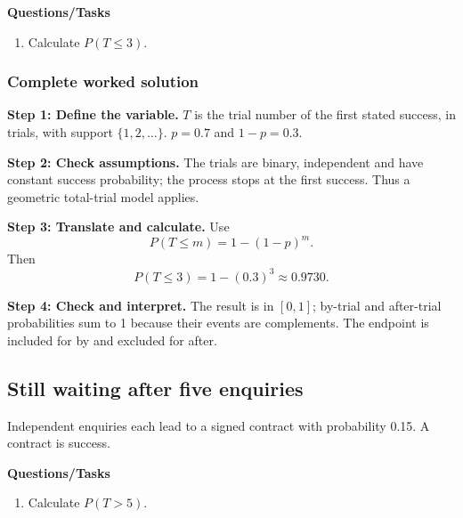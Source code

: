 \textbf{Questions/Tasks}
\begin{enumerate}
\item Calculate $P(T\leq3)$. 
\end{enumerate}
\subsubsection*{Complete worked solution}
\par\noindent\begin{minipage}{\linewidth}
\textbf{Step 1: Define the variable.} $T$ is the trial number of the first stated success, in trials, with support $\{1,2,\ldots\}$. $p=0.7$ and $1-p=0.3$.
\end{minipage}\par\medskip
\par\noindent\begin{minipage}{\linewidth}
\textbf{Step 2: Check assumptions.} The trials are binary, independent and have constant success probability; the process stops at the first success. Thus a geometric total-trial model applies.
\end{minipage}\par\medskip
\par\noindent\begin{minipage}{\linewidth}
\textbf{Step 3: Translate and calculate.} Use
\[P(T\leq m)=1-(1-p)^m.\]
Then
\[P(T\leq3)=1-(0.3)^3\approx 0.9730.\]
\end{minipage}\par\medskip
\par\noindent\begin{minipage}{\linewidth}
\textbf{Step 4: Check and interpret.} The result is in $[0,1]$; by-trial and after-trial probabilities sum to 1 because their events are complements. The endpoint is included for by and excluded for after. 
\end{minipage}\par\medskip
{}
\subsection{Still waiting after five enquiries}
Independent enquiries each lead to a signed contract with probability 0.15. A contract is success.

\textbf{Questions/Tasks}
\begin{enumerate}
\item Calculate $P(T>5)$. 
\end{enumerate}
